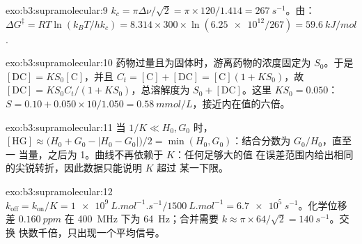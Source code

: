 \begin{solution}{exo:b3:supramolecular:9}
$k_c = \pi\Delta\nu/\sqrt2 = \pi \times 120/1.414 = \qty{267}{s^{-1}}$。由：
$\Delta G^\ddagger = RT\ln(k_BT/hk_c) = 8.314 \times 300 \times \ln(\num{6.25e12}/267) = \qty{59.6}{kJ/mol}$.
\end{solution}

\begin{solution}{exo:b3:supramolecular:10}
药物过量且为固体时，游离药物的浓度固定为 $S_0$。于是 $[\mathrm{DC}] = KS_0[\mathrm C]$，并且
$C_t = [\mathrm C] + [\mathrm{DC}] = [\mathrm C](1 + KS_0)$，故 $[\mathrm{DC}] = KS_0C_t/(1 + KS_0)$，总溶解度为 $S_0 + [\mathrm{DC}]$。这里
$KS_0 = 0.050$：$S = 0.10 + 0.050 \times 10/1.050 = \qty{0.58}{mmol/L}$，接近内在值的六倍。
\end{solution}

\begin{solution}{exo:b3:supramolecular:11}
当 $1/K \ll H_0, G_0$ 时，$[\mathrm{HG}] \approx \bigl(H_0 + G_0 - |H_0 - G_0|\bigr)/2 = \min(H_0, G_0)$：结合分数为 $G_0/H_0$，直至一
当量，之后为 1。曲线不再依赖于 $K$：任何足够大的值
在误差范围内给出相同的尖锐转折，因此数据只能说明 $K$ 超过
某一下限。
\end{solution}

\begin{solution}{exo:b3:supramolecular:12}
$k_{\mathrm{off}} = k_{\mathrm{on}}/K = \qty{1e9}{L.mol^{-1}.s^{-1}}/\qty{1500}{L.mol^{-1}} = \qty{6.7e5}{s^{-1}}$。化学位移差
$\qty{0.160}{ppm}$ 在 \qty{400}{MHz} 下为 \qty{64}{Hz}；合并需要 $k \approx \pi \times 64/\sqrt2 = \qty{140}{s^{-1}}$。交换
快数千倍，只出现一个平均信号。
\end{solution}

